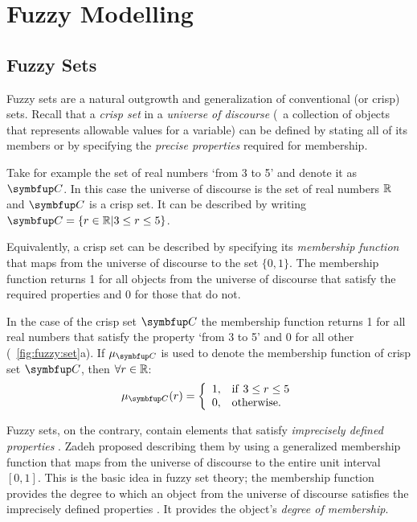 









\chapter{Fuzzy Modelling}
\label{ch:fuzzyModelling}


\section{Fuzzy Sets}
\label{sec:fuzzyModelling:fuzzySets}
Fuzzy sets are a natural outgrowth and generalization of conventional (or crisp) sets. Recall that a \emph{crisp set} in a \emph{universe of discourse} (\ie\ a collection of objects that represents allowable values for a variable) can be defined by stating all of its members or by specifying the \emph{precise properties} required for membership.

Take for example the set of real numbers `from 3 to 5' and denote it as $\set{C}$. In this case the universe of discourse is the set of real numbers $\mathbb{R}$ and $\set{C}$ is a crisp set. It can be described by writing $\set{C}=\{r \in \R| 3 \leq r \leq 5\}$.

Equivalently, a crisp set can be described by specifying its \emph{membership function} that maps from the universe of discourse to the set $\{0,1\}$. The membership function returns 1 for all objects from the universe of discourse that satisfy the required properties and 0 for those that do not.

In the case of the crisp set $\set{C}$ the membership function returns 1 for all real numbers that satisfy the property `from 3 to 5' and 0 for all other (\fig~\ref{fig:fuzzy:set}a). If $\mu_\set{C}$ is used to denote the membership function of crisp set $\set{C}$, then $\forall r \in \mathbb{R}$:
%
\begin{equation}
  \mu_\set{C}(r)=\left\{
   \begin{array}{ll}
     1, & \mathrm{if\ }3 \leq r \leq 5 \\
     0, & \mathrm{otherwise}.
   \end{array}
  \right.
\end{equation}

Fuzzy sets, on the contrary, contain elements that satisfy \emph{imprecisely defined properties} \cite{bezdek:1992}. Zadeh \cite{zadeh:1965} proposed describing them by using a generalized membership function that maps from the universe of discourse to the entire unit interval $[0,1]$. This is the basic idea in fuzzy set theory; the membership function provides the degree to which an object from the universe of discourse satisfies the imprecisely defined properties \cite{bezdek:1992}. It provides the object's \emph{degree of membership}.

